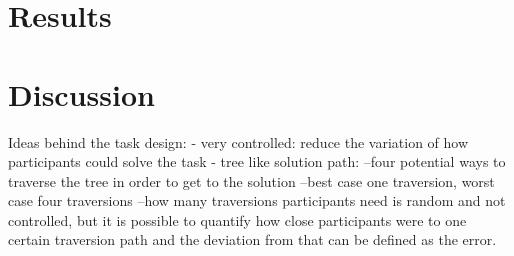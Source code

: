 \documentclass{article}
\begin{document}



\section{Results}



\section{Discussion}
Ideas behind the task design:
- very controlled: reduce the variation of how participants could solve the task
- tree like solution path: 
--four potential ways to traverse the tree in order to get to the solution
--best case one traversion, worst case four traversions
--how many traversions participants need is random and not controlled, but it is possible to quantify how close participants were to one certain traversion path and the deviation from that can be defined as the error.



\end{document}
